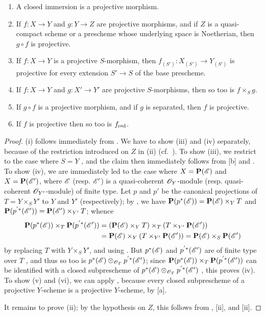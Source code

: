 \begin{prop}[5.5.5]
\label{2.5.5.5}
\medskip\noindent
\begin{enumerate}[label=\emph{(\roman*)}]
    \item A closed immersion is a projective morphism.
    \item If $f:X\to Y$ and $g:Y\to Z$ are projective morphisms, and if $Z$ is a quasi-compact scheme or a prescheme whose underlying space is Noetherian, then $g\circ f$ is projective.
    \item If $f:X\to Y$ is a projective $S$-morphism, then $f_{(S')}:X_{(S')}\to Y_{(S')}$ is projective for every extension $S'\to S$ of the base prescheme.
    \item If $f:X\to Y$ and $g:X'\to Y'$ are projective $S$-morphisms, then so too is $f\times_S g$.
    \item If $g\circ f$ is a projective morphism, and if $g$ is separated, then $f$ is projective.
    \item If $f$ is projective then so too is $f_{\mathrm{red}}$.
\end{enumerate}
\end{prop}

\begin{proof}
\label{proof-2.5.5.5}
(i) follows immediately from .
We have to show (iii) and (iv) separately, because of the restriction introduced on $Z$ in (ii) (cf.~).
To show (iii), we restrict to the case where $S=Y$ , and the claim then immediately follows from [b] and .
To show (iv), we are immediately led to the case where $X=\mathbf{P}(\mathscr{E})$ and $X=\mathbf{P}(\mathscr{E}')$, where $\mathscr{E}$ (resp. $\mathscr{E}'$) is a quasi-coherent $\mathscr{O}_Y$-module (resp. quasi-coherent $\mathscr{O}_{Y'}$-module) of finite type.
Let $p$ and $p'$ be the canonical projections of $T=Y\times_S Y'$ to $Y$ and $Y'$ (respectively);
by , we have $\mathbf{P}(p^*(\mathscr{E})) = \mathbf{P}(\mathscr{E})\times_Y T$ and $\mathbf{P}(p^{'*}(\mathscr{E}'))=\mathbf{P}(\mathscr{E}')\times_{Y'}T$;
whence
\begin{align*}
    \mathbf{P}(p^*(\mathscr{E}))\times_T\mathbf{P}(p^{'*}(\mathscr{E}'))
    &= (\mathbf{P}(\mathscr{E})\times_Y T)\times_T(T\times_{Y'}\mathbf{P}(\mathscr{E}'))\\
    &= \mathbf{P}(\mathscr{E})\times_Y(T\times_{Y'}\mathbf{P}(\mathscr{E}'))
    = \mathbf{P}(\mathscr{E})\times_S\mathbf{P}(\mathscr{E}')
\end{align*}
by replacing $T$ with $Y\times_S Y'$, and using .
But $p^*(\mathscr{E})$ and $p^{'*}(\mathscr{E}')$ are of finite type over $T$ , and thus so too is $p^*(\mathscr{E})\otimes_{\mathscr{O}_T}p^{'*}(\mathscr{E}')$;
since $\mathbf{P}(p^*(\mathscr{E}))\times_T\mathbf{P}(p^{'*}(\mathscr{E}'))$ can be identified with a closed subprescheme of $p^*(\mathscr{E})\otimes_{\mathscr{O}_T}p^{'*}(\mathscr{E}')$ , this proves (iv).
To show (v) and (vi), we can apply , because every closed subprescheme of a projective $Y$-scheme is a projective $Y$-scheme, by [a].

It remains to prove (ii);
by the hypothesis on $Z$, this follows from , [ii], and [ii].
\end{proof}

